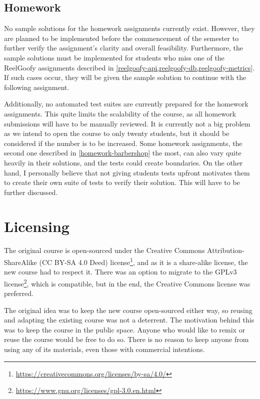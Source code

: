 \documentclass[
  digital,
  color,
  oneside,
  nosansbold,
  nocolorbold,
  nolof,
  nolot,
]{fithesis4}
\begin{document}
\subsection{Homework}

No sample solutions for the homework assignments currently exist. However, they are planned to be implemented before the commencement of the semester to further verify the assignment's clarity and overall feasibility. Furthermore, the sample solutions must be implemented for students who miss one of the ReelGoofy assignments described in \cref{reelgoofy-api,reelgoofy-db,reelgoofy-metrics}. If such cases occur, they will be given the sample solution to continue with the following assignment.

Additionally, no automated test suites are currently prepared for the homework assignments. This quite limits the scalability of the course, as all homework submissions will have to be manually reviewed. It is currently not a big problem as we intend to open the course to only twenty students, but it should be considered if the number is to be increased. Some homework assignments, the second one described in \cref{homework-barbershop} the most, can also vary quite heavily in their solutions, and the tests could create boundaries. On the other hand, I personally believe that not giving students tests upfront motivates them to create their own suite of tests to verify their solution. This will have to be further discussed.

\section{Licensing}

The original course is open-sourced under the Creative Commons Attribution-ShareAlike (CC BY-SA 4.0 Deed) license\footnote{\url{https://creativecommons.org/licenses/by-sa/4.0/}}, and as it is a share-alike license, the new course had to respect it. There was an option to migrate to the GPLv3 license\footnote{\url{https://www.gnu.org/licenses/gpl-3.0.en.html}}, which is compatible, but in the end, the Creative Commons license was preferred.

The original idea was to keep the new course open-sourced either way, so reusing and adapting the existing course was not a deterrent. The motivation behind this was to keep the course in the public space. Anyone who would like to remix or reuse the course would be free to do so. There is no reason to keep anyone from using any of its materials, even those with commercial intentions.
\end{document}
